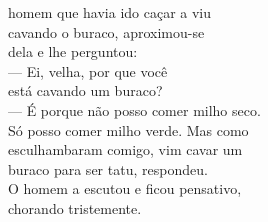 

 homem que havia ido caçar a viu\\
cavando o buraco, aproximou-se\\
dela e lhe perguntou:\\
--- Ei, velha, por que você\\
está cavando um buraco?\\
--- É porque não posso comer milho seco.\\
Só posso comer milho verde. Mas como\\
esculhambaram comigo, vim cavar um\\
buraco para ser tatu, respondeu.\\
O homem a escutou e ficou pensativo,\\
chorando tristemente.

\vspace{2em}

